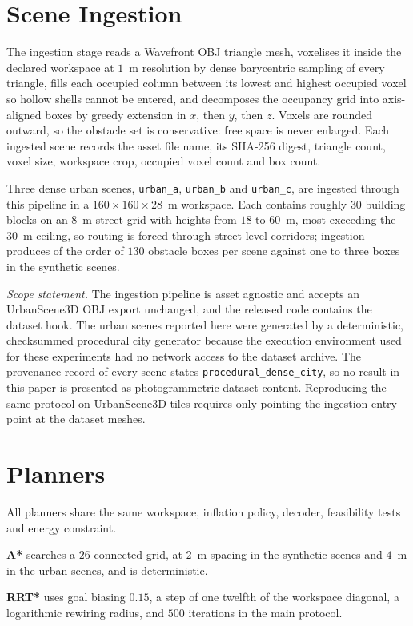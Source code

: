 \documentclass[conference]{IEEEtran}
\begin{document}
\section{Scene Ingestion}
The ingestion stage reads a Wavefront OBJ triangle mesh, voxelises it inside the
declared workspace at $1$~m resolution by dense barycentric sampling of every
triangle, fills each occupied column between its lowest and highest occupied
voxel so hollow shells cannot be entered, and decomposes the occupancy grid into
axis-aligned boxes by greedy extension in $x$, then $y$, then $z$. Voxels are
rounded outward, so the obstacle set is conservative: free space is never
enlarged. Each ingested scene records the asset file name, its SHA-256 digest,
triangle count, voxel size, workspace crop, occupied voxel count and box count.

Three dense urban scenes, \texttt{urban\_a}, \texttt{urban\_b} and
\texttt{urban\_c}, are ingested through this pipeline in a $160\times 160\times
28$~m workspace. Each contains roughly $30$ building blocks on an $8$~m street
grid with heights from $18$ to $60$~m, most exceeding the $30$~m ceiling, so
routing is forced through street-level corridors; ingestion produces of the
order of $130$ obstacle boxes per scene against one to three boxes in the
synthetic scenes.

\emph{Scope statement.} The ingestion pipeline is asset agnostic and accepts an
UrbanScene3D OBJ export unchanged, and the released code contains the dataset
hook. The urban scenes reported here were generated by a deterministic,
checksummed procedural city generator because the execution environment used for
these experiments had no network access to the dataset archive. The provenance
record of every scene states \texttt{procedural\_dense\_city}, so no result in
this paper is presented as photogrammetric dataset content. Reproducing the same
protocol on UrbanScene3D tiles requires only pointing the ingestion entry point
at the dataset meshes.

\section{Planners}
All planners share the same workspace, inflation policy, decoder, feasibility
tests and energy constraint.

\textbf{A*} searches a $26$-connected grid, at $2$~m spacing in the synthetic
scenes and $4$~m in the urban scenes, and is deterministic.

\textbf{RRT*} uses goal biasing $0.15$, a step of one twelfth of the workspace
diagonal, a logarithmic rewiring radius, and $500$ iterations in the main
protocol.
\end{document}
